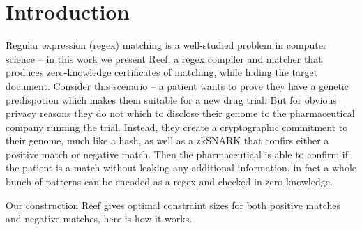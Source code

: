 \section{Introduction}
Regular expression (regex) matching is a well-studied problem in computer science -- in this work we present Reef, a regex compiler
and matcher that produces zero-knowledge certificates of matching, while hiding the target document. Consider this scenario --
a patient wants to prove they have a genetic predispotion which makes them suitable for a new drug trial. But for obvious privacy reasons
they do not which to disclose their genome to the pharmaceutical company running the trial. Instead, they create a cryptographic commitment to their genome, much like a hash,
as well as a zkSNARK that confirs either a positive match or negative match. Then the pharmaceutical is able to confirm if the patient is a match without leaking
any additional information, in fact a whole bunch of patterns can be encoded as a regex and checked in zero-knowledge.

Our construction Reef gives optimal constraint sizes for both positive matches and negative matches, here is how it works.


